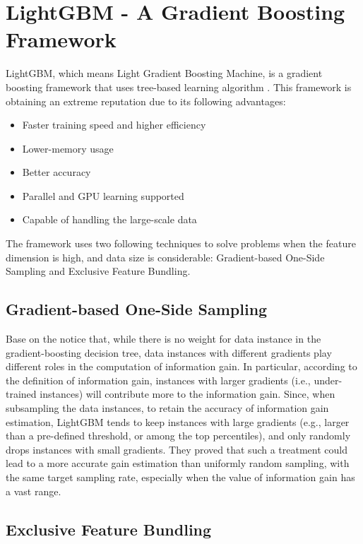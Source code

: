 \section{LightGBM - A Gradient Boosting Framework}

LightGBM, which means Light Gradient Boosting Machine, is a gradient boosting framework that uses tree-based learning algorithm \cite{ke2017lightgbm}. This framework is obtaining an extreme reputation due to its following advantages:

\begin{itemize}
\item Faster training speed and higher efficiency
\item Lower-memory usage
\item Better accuracy
\item Parallel and GPU learning supported
\item Capable of handling the large-scale data
\end{itemize}

The framework uses two following techniques to solve problems when the feature dimension is high, and data size is considerable: Gradient-based One-Side Sampling and Exclusive Feature Bundling.

\subsection{Gradient-based One-Side Sampling}

Base on the notice that, while there is no weight for data instance in the gradient-boosting decision tree, data instances with different gradients play different roles in the computation of information gain. 
In particular, according to the definition of information gain, instances with larger gradients (i.e., under-trained instances) will contribute more to the information gain.
Since, when subsampling the data instances, to retain the accuracy of information gain estimation, LightGBM tends to keep instances with large gradients (e.g., larger than a pre-defined threshold, or among the top percentiles), and only randomly drops instances with small gradients.
They proved that such a treatment could lead to a more accurate gain estimation than uniformly random sampling, with the same target sampling rate, especially when the value of information gain has a vast range.

\subsection{Exclusive Feature Bundling}

